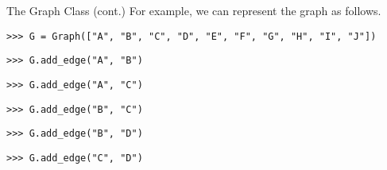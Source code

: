\documentclass{beamer}
\begin{document}
\begin{frame}[fragile]{The Graph Class (cont.)}
  For example, we can represent the graph as follows. \pause
  \begin{figure}
  \end{figure}
  \begin{block}{}
    \tiny
    \begin{lstlisting}[gobble=4]
    >>> G = Graph(["A", "B", "C", "D", "E", "F", "G", "H", "I", "J"])
    \end{lstlisting}
    \pause
    \begin{lstlisting}[gobble=4]
    >>> G.add_edge("A", "B")
    \end{lstlisting}
    \pause
    \begin{lstlisting}[gobble=4]
    >>> G.add_edge("A", "C")
    \end{lstlisting}
    \pause
    \begin{lstlisting}[gobble=4]
    >>> G.add_edge("B", "C")
    \end{lstlisting}
    \pause
    \begin{lstlisting}[gobble=4]
    >>> G.add_edge("B", "D")
    \end{lstlisting}
    \pause
    \begin{lstlisting}[gobble=4]
    >>> G.add_edge("C", "D")
    \end{lstlisting}
    \pause
    \begin{lstlisting}[gobble=4]

\end{lstlisting}
\end{block}
\end{frame}
\end{document}
